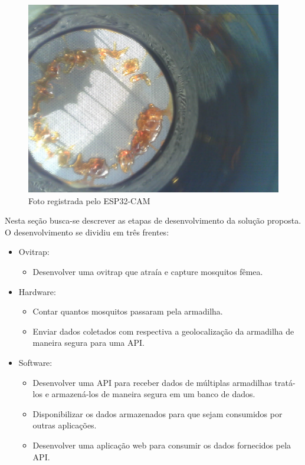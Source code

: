 \documentclass[
	12pt,				%
	openright,			%
	oneside,			%
	a4paper,			%
	chapter=TITLE,		%
	english,			%
	brazil				%
	]{abntex2}
\begin{document}
\begin{figure}[H]
    \centering
    \includegraphics[scale=0.2]{imagens/fotoESP32.jpeg}
    \caption{Foto registrada pelo ESP32-CAM}
        \label{fig:fotoesp32}
    \end{figure}

Nesta seção busca-se descrever as etapas de desenvolvimento da solução proposta. O desenvolvimento se dividiu em três frentes:

\begin{itemize}
    \item Ovitrap:
        \begin{itemize}
        \item Desenvolver uma ovitrap que atraía e capture mosquitos fêmea.
        \end{itemize}
    \item Hardware:
        \begin{itemize}
        \item Contar quantos mosquitos passaram pela armadilha.
        \item Enviar dados coletados com respectiva a geolocalização da armadilha de maneira segura para uma API.
        \end{itemize}
    \item Software:
        \begin{itemize}
        \item Desenvolver uma API para receber dados de múltiplas armadilhas tratá-los e armazená-los de maneira segura em um 
        banco de dados.
        \item Disponibilizar os dados armazenados para que sejam consumidos por outras aplicações.
        \item Desenvolver uma aplicação web para consumir os dados fornecidos pela API.
        \end{itemize}
\end{itemize}
\end{document}
